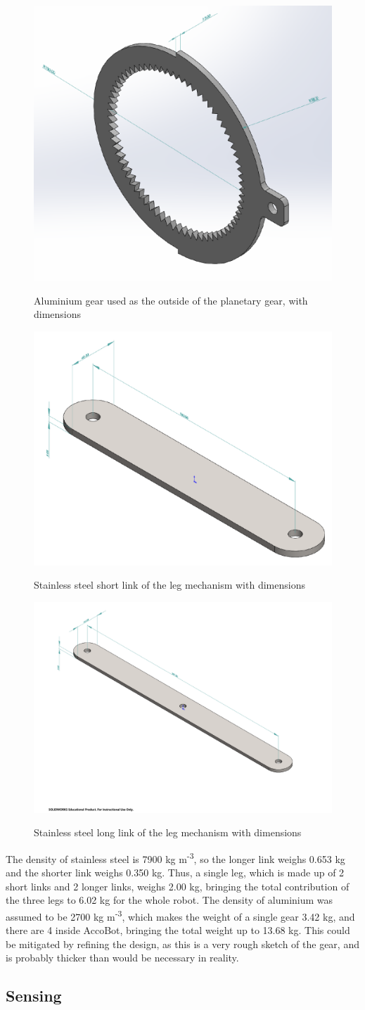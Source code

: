 \documentclass[11pt]{article}		%
\newcommand{\supercite}[1]{\textsuperscript{\cite{#1}}}		%
\begin{document}
			\begin{figure}[h]
				\centering
				\begin{multicols}{3}
					\includegraphics[height=0.21\textwidth]{gearCAD}
					\caption{Aluminium gear used as the outside of the planetary gear, with dimensions}
					\label{gearCAD}
					\columnbreak
					\includegraphics[height=0.21\textwidth]{shortLinkCAD}
					\caption{Stainless steel short link of the leg mechanism with dimensions}
					\label{shortLinkCAD}
					\columnbreak
					\includegraphics[height=0.21\textwidth]{longLinkCAD}
					\caption{Stainless steel long link of the leg mechanism with dimensions}
					\label{longLinkCAD}
				\end{multicols}
			\end{figure}
			The density of stainless steel is 7900 kg m\textsuperscript{-3}\supercite{HLT}, so the longer link weighs 0.653 kg and the shorter link weighs 0.350 kg.
			Thus, a single leg, which is made up of 2 short links and 2 longer links, weighs 2.00 kg, bringing the total contribution of the three legs to 6.02 kg for the whole robot.
			The density of aluminium was assumed to be 2700 kg m\textsuperscript{-3}\supercite{HLT}, which makes the weight of a single gear 3.42 kg, and there are 4 inside AccoBot, bringing the total weight up to 13.68 kg.
			This could be mitigated by refining the design, as this is a very rough sketch of the gear, and is probably thicker than would be necessary in reality.
		
		\subsection[Sensing]{Sensing}
\end{document}
